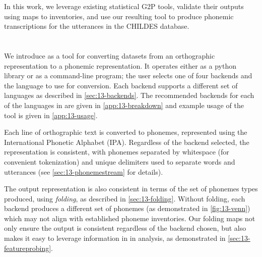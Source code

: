 In this work, we leverage existing statistical G2P tools, validate their outputs using maps to \phoible inventories, and use our resulting tool to produce phonemic transcriptions for the utterances in the CHILDES database.


\section{\corpusphonemizer}

We introduce \corpusphonemizer as a tool for converting datasets from an orthographic representation to a phonemic representation. It operates either as a python library or as a command-line program; the user selects one of four backends and the language to use for conversion. Each backend supports a different set of languages as described in \cref{sec:13-backends}. The recommended backends for each of the languages in \ipachildes are given in \cref{app:13-breakdown} and example usage of the tool is given in \cref{app:13-usage}.

Each line of orthographic text is converted to phonemes, represented using the International Phonetic Alphabet (IPA). Regardless of the backend selected, the representation is consistent, with phonemes separated by whitespace (for convenient tokenization) and unique delimiters used to separate words and utterances (see \cref{sec:13-phonemestream} for details). 

The output representation is also consistent in terms of the set of phonemes types produced, using \emph{folding}, as described in \cref{sec:13-folding}. Without folding, each backend produces a different set of phonemes (as demonstrated in \cref{fig:13-venn}) which may not align with established phoneme inventories. Our folding maps not only ensure the output is consistent regardless of the backend chosen, but also makes it easy to leverage information in \phoible in analysis, as demonstrated in \cref{sec:13-featureprobing}.



